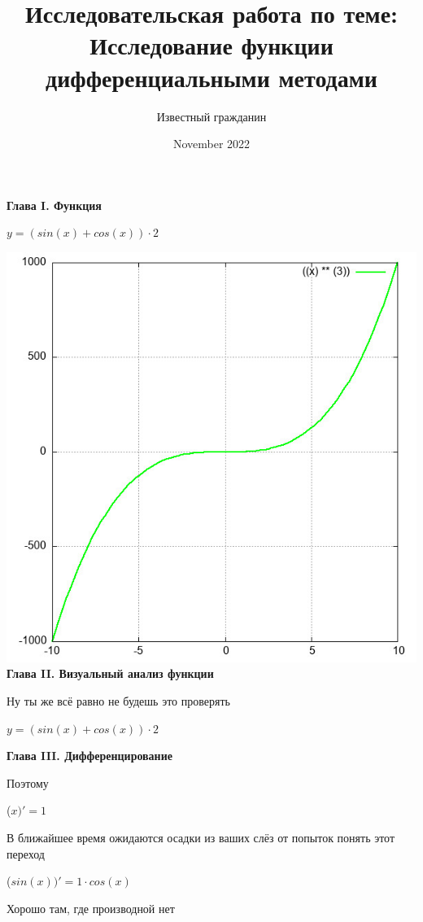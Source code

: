 \documentclass[12pt,a4paper,fleqn]{article}
\title{\textbf{\LARGE{Исследовательская работа по теме:\\Исследование функции дифференциальными методами}}}
\author{Известный гражданин}
\date{November 2022}
\begin{document}
\maketitle
\newpage\newpage \textbf{\LARGE{Глава I. Функция}}

\begin{center}
$y = $$(sin(x)+cos(x)) \cdot 2$

\end{center}
\includegraphics{GraphicDumps/plot.jpg}\newpage \textbf{\LARGE{Глава II. Визуальный анализ функции}}

Ну ты же всё равно не будешь это проверять

\begin{center}
$y = $$(sin(x)+cos(x)) \cdot 2$

\end{center}
\newpage \textbf{\LARGE{Глава III. Дифференцирование}}

Поэтому

\begin{center}
 ($x)'
  = 1$\end{center}
В ближайшее время ожидаются осадки из ваших слёз от попыток понять этот переход

\begin{center}
 ($sin(x))'
  = 1 \cdot cos(x)$\end{center}
Хорошо там, где производной нет\cite{link2}
\end{document}
